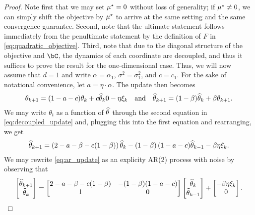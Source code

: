 \begin{proof}
    Note first that we may set $\mu^{\star} = 0$ without loss of generality; if $\mu^{\star} \neq 0$, we can simply shift the objective by $\mu^{\star}$ to arrive at the same setting and the same convergence guarantee. Second, note that the ultimate statement follows immediately from the penultimate statement by the definition of $F$ in \eqref{eq:quadratic_objective}.  Third, note that due to the diagonal structure of the objective and $\bC$, the dynamics of each coordinate are decoupled, and thus it suffices to prove the result for the one-dimensional case.  Thus, we will now assume that $d = 1$ and write $\alpha = \alpha_1$, $\sigma^2 = \sigma_1^2$, and $c = c_1$.  For the sake of notational convenience, let $a = \eta \cdot \alpha$.  The update then becomes
    \begin{align}\label{eq:decoupled_update}
        \theta_{k+1} = (1 - a - c) \theta_k + c \widehat{\theta}_k 0 - \eta \xi_k \quad \text{and} \quad \widehat{\theta}_{k+1} = (1 - \beta) \widehat{\theta}_k + \beta \theta_{k+1}.
    \end{align}
    We may write $\theta_t$ as a function of $\widehat{\theta}$ through the second equation in \eqref{eq:decoupled_update} and, plugging this into the first equation and rearranging, we get
    \begin{align}\label{eq:ar_update}
        \widehat{\theta}_{k+1} = \left( 2 - a - \beta - c(1 - \beta) \right) \widehat{\theta}_k - \left( 1 - \beta \right)(1 - a - c) \widehat{\theta}_{k-1} - \beta \eta \xi_k.
    \end{align}
    We may rewrite \eqref{eq:ar_update} as an explicity AR(2) process with noise by observing that
    \begin{align}
        \begin{bmatrix}
            \thetahat_{k+1} \\
            \thetahat_k
        \end{bmatrix} = \begin{bmatrix}
            2 - a - \beta - c(1 - \beta) & -(1 - \beta)(1 - a - c) \\
            1 & 0
        \end{bmatrix} \begin{bmatrix}
            \thetahat_k \\
            \thetahat_{k-1}
        \end{bmatrix} + \begin{bmatrix}
            -\beta \eta \xi_k \\
            0
        \end{bmatrix}.

\end{align}
\end{proof}
